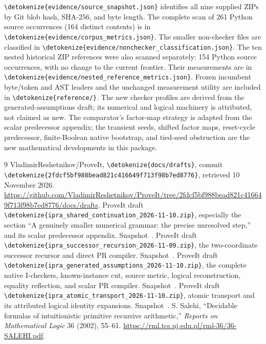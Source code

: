 \documentclass[11pt,letterpaper]{article}
\theoremstyle{definition}\newtheorem{definition}[theorem]{Definition}
\theoremstyle{remark}\newtheorem{remark}[theorem]{Remark}
\newcommand{\file}[1]{\expandafter\nolinkurl\expandafter{\detokenize{#1}}}
\begin{document}
\file{evidence/source_snapshot.json} identifies all nine supplied ZIPs
by Git blob hash, SHA-256, and byte length. The complete scan of 261 Python
source occurrences (164 distinct contents) is in
\file{evidence/corpus_metrics.json}. The smaller non-checker files are
classified in \file{evidence/nonchecker_classification.json}.
The ten nested historical ZIP references were also scanned separately:
154 Python source occurrences, with no change to the current frontier.
Their measurements are in \file{evidence/nested_reference_metrics.json}.
Frozen
incumbent byte/token and AST leaders and the unchanged measurement
utility are included in \file{reference/}. The new checker profiles are
derived from the generated-assumptions draft; its numerical and logical
machinery is attributed, not claimed as new. The comparator's factor-map
strategy is adapted from the scalar predecessor appendix; the transient
seeds, shifted factor maps, reset-cycle predecessor, finite-Boolean native
bootstrap, and tied-seed obstruction are the new mathematical developments in this package.

\begin{thebibliography}{9}
 VladimirReshetnikov/ProveIt, \mbox{\file{docs/drafts}}, commit
\file{2fdcf5bf988bead821c416649f713f98b7ed8776}, retrieved 10 November 2026.
\url{https://github.com/VladimirReshetnikov/ProveIt/tree/2fdcf5bf988bead821c416649f713f98b7ed8776/docs/drafts}.
 ProveIt draft \file{ipra_shared_continuation_2026-11-10.zip},
especially the section ``A genuinely smaller numerical grammar: the precise
unresolved step,'' and its scalar predecessor appendix. Snapshot~\cite{snapshot}.
 ProveIt draft \file{ipra_successor_recursion_2026-11-09.zip},
the two-coordinate successor recursor and direct PR compiler. Snapshot~\cite{snapshot}.
 ProveIt draft \file{ipra_generated_assumptions_2026-11-10.zip},
the complete native I-checkers, known-instance cut, source metric,
logical reconstruction, equality reflection, and scalar PR compiler.
Snapshot~\cite{snapshot}.
 ProveIt draft \file{ipra_atomic_transport_2026-11-10.zip},
atomic transport and its attributed logical identity expansions.
Snapshot~\cite{snapshot}.
 S. Salehi, ``Decidable formulas of intuitionistic primitive
recursive arithmetic,'' \emph{Reports on Mathematical Logic} 36 (2002), 55--61.
\url{https://rml.tcs.uj.edu.pl/rml-36/36-SALEHI.pdf}.
\end{thebibliography}
\end{document}
